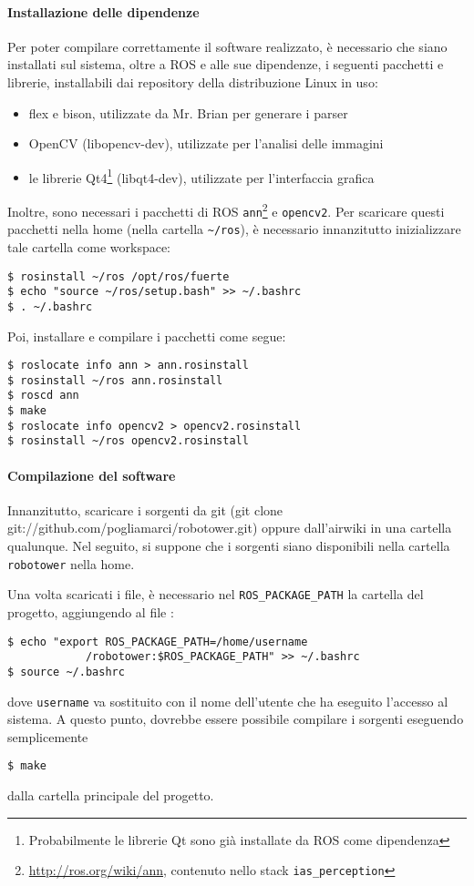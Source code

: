 \paragraph{Installazione delle dipendenze} Per poter compilare correttamente il software realizzato, è necessario che siano installati sul sistema, oltre a ROS e alle sue dipendenze, i seguenti pacchetti e librerie, installabili dai repository della distribuzione Linux in uso:
\begin{itemize}
\item flex e bison, utilizzate da Mr. Brian per generare i parser
\item OpenCV (libopencv-dev), utilizzate per l'analisi delle immagini
\item le librerie Qt4\footnote{Probabilmente le librerie Qt sono già installate da ROS come dipendenza} (libqt4-dev), utilizzate per l'interfaccia grafica
\end{itemize}
Inoltre, sono necessari i pacchetti di ROS \verb|ann|\footnote{\url{http://ros.org/wiki/ann}, contenuto nello stack \texttt{ias\_perception}} e \verb|opencv2|. Per scaricare questi pacchetti nella home (nella cartella \verb|~/ros|), è necessario innanzitutto inizializzare tale cartella come workspace:
\begin{verbatim}
$ rosinstall ~/ros /opt/ros/fuerte
$ echo "source ~/ros/setup.bash" >> ~/.bashrc
$ . ~/.bashrc
\end{verbatim}
Poi, installare e compilare i pacchetti come segue:
\begin{verbatim}
$ roslocate info ann > ann.rosinstall
$ rosinstall ~/ros ann.rosinstall
$ roscd ann
$ make
$ roslocate info opencv2 > opencv2.rosinstall
$ rosinstall ~/ros opencv2.rosinstall
\end{verbatim}
\paragraph{Compilazione del software} Innanzitutto, scaricare i sorgenti da git (git clone git://github.com/pogliamarci/robotower.git) oppure dall'airwiki in una cartella qualunque. Nel seguito, si suppone che i sorgenti siano disponibili nella cartella \verb|robotower| nella home.

Una volta scaricati i file, è necessario nel \verb|ROS_PACKAGE_PATH| la cartella del progetto, aggiungendo al file :
\begin{verbatim}
$ echo "export ROS_PACKAGE_PATH=/home/username
            /robotower:$ROS_PACKAGE_PATH" >> ~/.bashrc
$ source ~/.bashrc
\end{verbatim}
dove \verb|username| va sostituito con il nome dell'utente che ha eseguito l'accesso al sistema.
A questo punto, dovrebbe essere possibile compilare i sorgenti eseguendo semplicemente
\begin{verbatim}
$ make
\end{verbatim}
dalla cartella principale del progetto.

